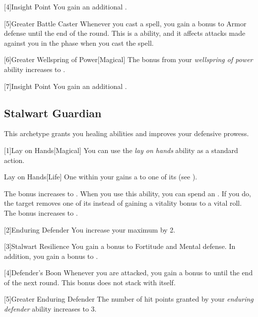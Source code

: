         [4]{Insight Point} You gain an additional .

        [5]{Greater Battle Caster} Whenever you cast a spell, you gain a  bonus to Armor defense until the end of the round.
        This is a  ability, and it affects attacks made against you in the phase when you cast the spell.

        [6]{Greater Wellspring of Power}[Magical]
        The bonus from your \textit{wellspring of power} ability increases to .

        [7]{Insight Point} You gain an additional .

    \subsection{Stalwart Guardian}
        This archetype grants you healing abilities and improves your defensive prowess.

        [1]{Lay on Hands}[Magical] You can use the \textit{lay on hands} ability as a standard action.
        \begin{freeability}{Lay on Hands}[Life]
            One  within your  gains a   to one of its  (see ).

            \rankline
             The bonus increases to .
             When you use this ability, you can spend an .
            If you do, the target removes one of its  instead of gaining a vitality bonus to a vital roll.
             The bonus increases to .
        \end{freeability}

        [2]{Enduring Defender}
        You increase your maximum  by 2.

        [3]{Stalwart Resilience}
        You gain a  bonus to Fortitude and Mental defense.
        In addition, you gain a  bonus to .

        [4]{Defender's Boon}
        Whenever you are attacked, you gain a  bonus to  until the end of the next round.
        This bonus does not stack with itself.

        [5]{Greater Enduring Defender}
        The number of hit points granted by your \textit{enduring defender} ability increases to 3.

